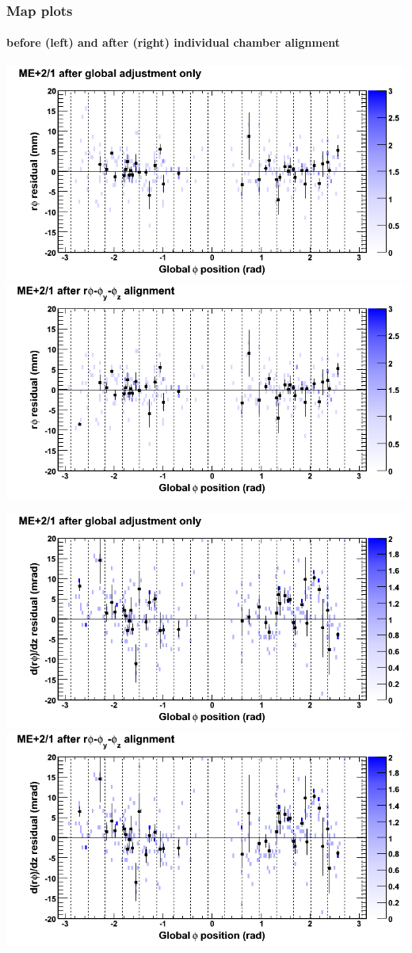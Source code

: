 \documentclass[compress]{beamer}
\begin{document}
\begin{frame}
\frametitle{Map plots}
\framesubtitle{before (left) and after (right) individual chamber alignment}
\includegraphics[width=0.5\linewidth]{ringmapplots_3dof/before_CSCvsphi_mep21_x.png} \includegraphics[width=0.5\linewidth]{ringmapplots_3dof/after_CSCvsphi_mep21_x.png}

\includegraphics[width=0.5\linewidth]{ringmapplots_3dof/before_CSCvsphi_mep21_dxdz.png} \includegraphics[width=0.5\linewidth]{ringmapplots_3dof/after_CSCvsphi_mep21_dxdz.png}
\end{frame}
\end{document}
